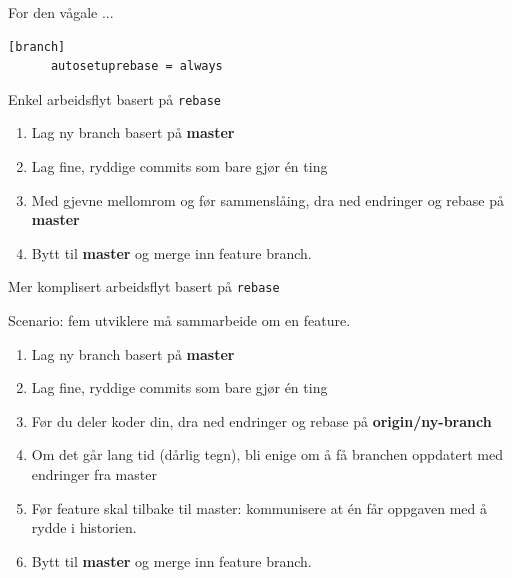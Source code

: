 \documentclass{beamer}
\begin{document}
\begin{frame}[fragile]{For den vågale ...}
    \begin{lstlisting}[language=bash, caption=\textasciitilde/.gitconfig]
    [branch]  
      autosetuprebase = always
    \end{lstlisting}
\end{frame}

\begin{frame}{Enkel arbeidsflyt basert på \texttt{rebase}}
    \begin{enumerate}
        \item<+-> Lag ny branch basert på \textbf{master}
        \item<+-> Lag fine, ryddige commits som bare gjør én ting
        \item<+-> Med gjevne mellomrom og før sammenslåing, dra ned endringer og rebase på \textbf{master}
        \item<+-> Bytt til \textbf{master} og merge inn feature branch.
    \end{enumerate}
\end{frame}

\begin{frame}{Mer komplisert arbeidsflyt basert på \texttt{rebase}}

    Scenario: fem utviklere må sammarbeide om en feature.

    \begin{enumerate}
        \item<+-> Lag ny branch basert på \textbf{master}
        \item<+-> Lag fine, ryddige commits som bare gjør én ting
        \item<+-> Før du deler koder din, dra ned endringer og rebase på \textbf{origin/ny-branch}
        \item<+-> Om det går lang tid (dårlig tegn), bli enige om å få branchen oppdatert med endringer fra master
        \item<+-> Før feature skal tilbake til master: kommunisere at én får oppgaven med å rydde i historien.
        \item<+-> Bytt til \textbf{master} og merge inn feature branch.
    \end{enumerate}
\end{frame}

\end{document}
